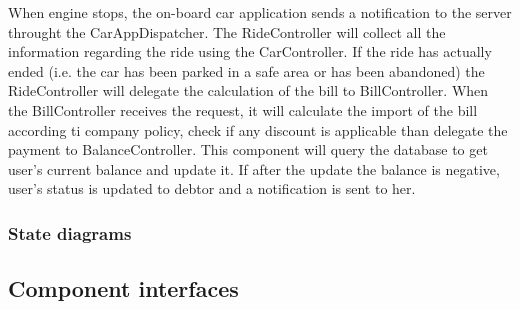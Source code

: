 \documentclass{article}
\begin{document}
When engine stops, the on-board car application sends a notification to the server throught the CarAppDispatcher. The RideController will collect all the information regarding the ride using the CarController. If the ride has actually ended (i.e. the car has been parked in a safe area or has been abandoned) the RideController will delegate the calculation of the bill to BillController. When the BillController receives the request, it will calculate the import of the bill according ti company policy, check if any discount is applicable than delegate the payment to BalanceController. This component will query the database to get user's current balance and update it. If after the update the balance is negative, user's status is updated to debtor and a notification is sent to her.
\newpage

\subsubsection{State diagrams}
\begin{figure}[ht]
\end{figure}
\newpage
\subsection{Component interfaces}
\end{document}

